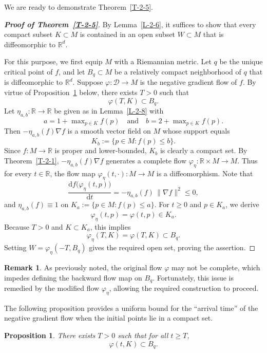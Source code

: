 \documentclass[11pt,letterpaper]{amsart}
\theoremstyle{plain}
\newtheorem{proposition}[theorem]{Proposition}
\theoremstyle{definition}
\newtheorem{remark}[theorem]{Remark}
\theoremstyle{remark}
\numberwithin{equation}{section}
\begin{document}
We are ready to demonstrate Theorem~\ref{T-2-5}.

\begin{proof}[\textbf{Proof of Theorem~\ref{T-2-5}}]
By Lemma~\ref{L-2-6}, it suffices to show that every compact subset $K\subset M$ is contained in an open subset $W\subset M$ that is diffeomorphic to $\mathbb{R}^d$.

For this purpose, we first equip $M$ with a Riemannian metric. Let $q$ be the unique critical point of $f$, and let $B_q\subset M$ be a relatively compact neighborhood of $q$ that is diffeomorphic to $\mathbb{R}^d$. Suppose $\varphi:\mathcal D\to M$ is the negative gradient flow of $f$. By virtue of Proposition~\ref{P-2-10} below, there exists $T>0$ such that
\[
\varphi(T,K)\subset B_q.
\]
Let $\eta_{a,b}: \mathbb R\to\mathbb R$ be given as in Lemma~\ref{L-2-8} with
\[
a=1+\max\nolimits_{p\in K} f(p)\quad\text{and}\quad b=2+\max\nolimits_{p\in K} f(p).
\]
Then $-\eta_{a,b}(f)\nabla f$ is a smooth vector field on $M$ whose support equals
\[
K_b:=\big\{p\in M: f(p)\leq b\big\}.
\]
Since $f: M\to\mathbb R$ is proper and lower-bounded,  $K_b$ is clearly a compact set. By Theorem~\ref{T-2-1}, $-\eta_{a,b}(f)\nabla f$ generates a complete flow
$\varphi_\eta:\mathbb R\times M\to M$. Thus for every
$t\in \mathbb R$, the flow map
$\varphi_\eta(t,\cdot):M \to M$ is a diffeomorphism. Note that
\[
\frac{\mathrm{d}f\big(\varphi_\eta(t,p)\big)}{\mathrm{d}t}
=-\eta_{a,b}(f)\,\| \nabla f \|^2\leq 0,
\]
and $\eta_{a,b}(f)\equiv1$ on
$K_a:=\big\{p\in M: f(p)\leq a\big\}$.
For $t\geq 0$ and $p\in K_a$, we derive
 \[
\varphi_\eta(t,p)=\varphi(t,p)\in K_a.
\]
Because $T>0$ and $K\subset K_a$, this implies
\[
\varphi_\eta(T,K)=\varphi(T,K)\subset B_q.
\]
Setting $W=\varphi_\eta(-T,B_q)$ gives the required open set, proving the assertion.
\end{proof}

\begin{remark}
As previously noted, the original flow $\varphi$ may not be complete, which impedes defining the backward flow map on $B_q$. Fortunately, this issue is remedied by the modified flow $\varphi_\eta$, allowing the required construction to proceed.
\end{remark}


The following proposition provides a uniform bound for the ``arrival time'' of the negative gradient flow when the initial points lie in a compact set.
\begin{proposition}\label{P-2-10}
There exists $T>0$ such that for all $t\geq T$,
\[
\varphi(t,K)\subset B_q.
\]
\end{proposition}
\end{document}
